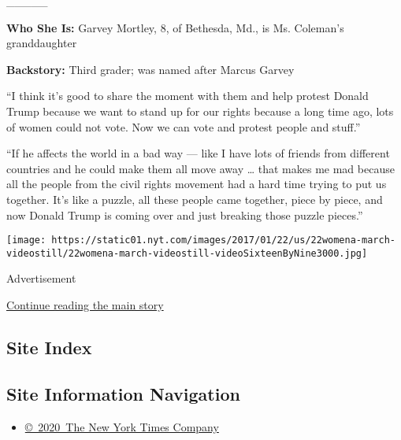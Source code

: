 \_\_\_\_\_

\textbf{Who She Is:} Garvey Mortley, 8, of Bethesda, Md., is Ms.
Coleman's granddaughter

\textbf{Backstory:} Third grader; was named after Marcus Garvey

``I think it's good to share the moment with them and help protest
Donald Trump because we want to stand up for our rights because a long
time ago, lots of women could not vote. Now we can vote and protest
people and stuff.''

``If he affects the world in a bad way --- like I have lots of friends
from different countries and he could make them all move away \ldots{}
that makes me mad because all the people from the civil rights movement
had a hard time trying to put us together. It's like a puzzle, all these
people came together, piece by piece, and now Donald Trump is coming
over and just breaking those puzzle pieces.''

\texttt{[image: https://static01.nyt.com/images/2017/01/22/us/22womena-march-videostill/22womena-march-videostill-videoSixteenByNine3000.jpg]}

Advertisement

\protect\hyperlink{after-bottom}{Continue reading the main story}

\hypertarget{site-index}{%
\subsection{Site Index}\label{site-index}}

\hypertarget{site-information-navigation}{%
\subsection{Site Information
Navigation}\label{site-information-navigation}}

\begin{itemize}
\tightlist
\item
  \href{https://help.nytimes.com/hc/en-us/articles/115014792127-Copyright-notice}{©~2020~The
  New York Times Company}
\end{itemize}

